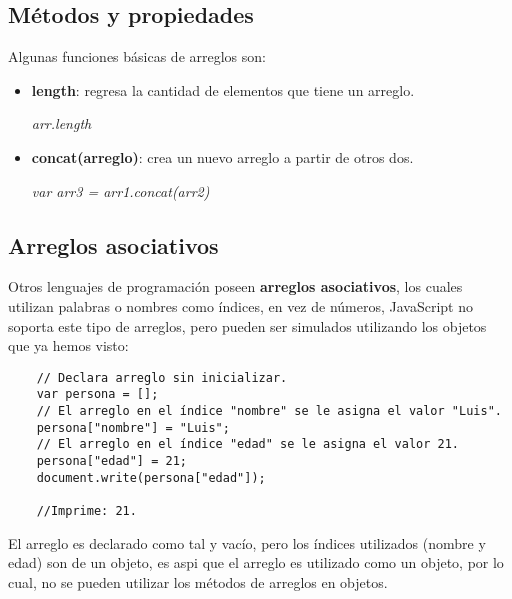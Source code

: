 \subsection{Métodos y propiedades}

Algunas funciones básicas de arreglos son:
\begin{itemize}
    \item \textbf{length}: regresa la cantidad de elementos que tiene un arreglo.
    \begin{center}
        \textit{arr.length}
    \end{center}
    \item \textbf{concat(arreglo)}: crea un nuevo arreglo a partir de otros dos.
    \begin{center}
        \textit{var arr3 = arr1.concat(arr2)}
    \end{center}
\end{itemize}


\subsection{Arreglos asociativos}

Otros lenguajes de programación poseen \textbf{arreglos asociativos}, los cuales utilizan palabras o nombres como índices, en vez de números, JavaScript no soporta este tipo de arreglos, pero pueden ser simulados utilizando los objetos que ya hemos visto:
\begin{lstlisting}
    // Declara arreglo sin inicializar.
    var persona = [];
    // El arreglo en el índice "nombre" se le asigna el valor "Luis".
    persona["nombre"] = "Luis";
    // El arreglo en el índice "edad" se le asigna el valor 21.
    persona["edad"] = 21;
    document.write(persona["edad"]);

    //Imprime: 21.
\end{lstlisting}

El arreglo es declarado como tal y vacío, pero los índices utilizados (nombre y edad) son de un objeto, es aspi que el arreglo es utilizado como un objeto, por lo cual, no se pueden utilizar los métodos de arreglos en objetos.
